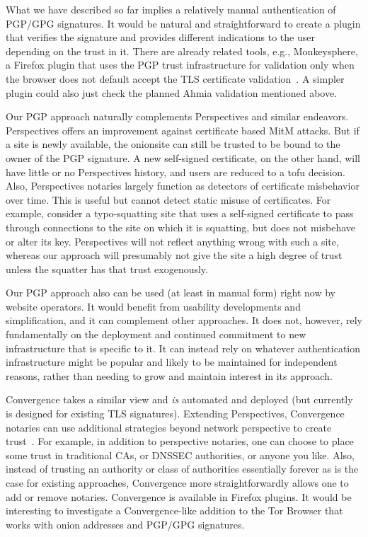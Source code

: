 \documentclass[10pt, conference, compsocconf]{styles/IEEEtran}
\begin{document}
What we have described so far implies a relatively manual
authentication of PGP/GPG signatures. It would be natural and
straightforward to create a plugin that verifies the signature and
provides different indications to the user depending on the trust in
it.  There are already related tools, e.g., Monkeysphere, a Firefox
plugin that uses the PGP trust infrastructure for validation only when
the browser does not default accept the TLS certificate
validation~\cite{monkeysphere}. A simpler plugin could also
just check the planned Ahmia validation mentioned above.

Our PGP approach naturally complements Perspectives and similar
endeavors. Perspectives offers an improvement against
certificate based MitM attacks. But if a site is newly available,
the onionsite can still be trusted to be bound to the owner of
the PGP signature. A new self-signed certificate, on the other hand,
will have little or no
Perspectives history, and users are reduced to a tofu
decision. Also, Perspectives notaries largely function as
detectors of certificate misbehavior over time. This is useful
but cannot detect static misuse of certificates.
For example, consider a typo-squatting site that uses a self-signed
certificate to pass through connections to the site on which it is
squatting, but
does not misbehave or alter its key. Perspectives will not reflect
anything wrong with such a site, whereas our approach will presumably
not give the site a high degree of trust unless the squatter has
that trust exogenously. 

Our PGP approach also can be used (at least in manual form) right now by
website operators. It would benefit from usability developments
and simplification, and it can complement other approaches. It does not,
however,
rely fundamentally on the deployment and continued commitment to new
infrastructure that is specific to it.  It can instead
rely on whatever authentication infrastructure might be popular
and likely to be maintained for independent reasons, rather than
needing to grow and maintain interest in its approach.

Convergence takes a similar view and \emph{is} automated and deployed
(but currently is designed for existing TLS signatures).  Extending
Perspectives, Convergence notaries can use additional strategies
beyond network perspective to create trust~\cite{convergence}. For
example, in addition to perspective notaries, one can choose to place
some trust in traditional CAs, or DNSSEC authorities, or anyone you
like. Also, instead of trusting an authority or class of authorities
essentially forever as is the case for existing approaches,
Convergence more straightforwardly allows one to add or remove
notaries. Convergence is available in Firefox plugins. It would be
interesting to investigate a Convergence-like addition to the Tor
Browser that works with onion addresses and PGP/GPG signatures.
\end{document}
